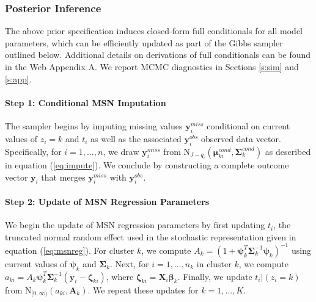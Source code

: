 \documentclass[useAMS,referee]{biom}
\begin{document}
\subsubsection{Posterior Inference} 
\label{s:postinf}
The above prior specification induces closed-form full conditionals for all model parameters, which can be efficiently updated as part of the Gibbs sampler outlined below. Additional details on derivations of full conditionals can be found in the Web Appendix A. We report MCMC diagnostics in Sections \ref{s:sim} and \ref{s:app}. 

\paragraph{\textbf{Step 1}: Conditional MSN Imputation} The sampler begins by imputing missing values $\mathbf{y}_i^{miss}$ conditional on current values of $z_i = k$ and $t_i$ as well as the associated $\mathbf{y}_i^{obs}$ observed data vector. Specifically, for $i = 1,...,n$, we draw $\mathbf{y}_i^{miss}$ from $\text{N}_{J-q_i}(\boldsymbol\mu^{cond}_{ki},\boldsymbol\Sigma^{cond}_k)$ as described in equation (\ref{eq:impute}). We conclude by constructing a complete outcome vector $\mathbf{y}_i$ that merges $\mathbf{y}_i^{miss}$ with $\mathbf{y}_i^{obs}$.

\paragraph{\textbf{Step 2:} Update of MSN Regression Parameters} We begin the update of MSN regression parameters by first updating $t_i$, the truncated normal random effect used in the stochastic representation given in equation (\ref{eq:msnreg}). For cluster $k$, we compute $A_k = (1 + \boldsymbol\psi_k^T \boldsymbol\Sigma^{-1}_k\boldsymbol
\psi_k)^{-1}$ using current values of $\boldsymbol\psi_k$ and $\boldsymbol\Sigma_k$. Next, for $i = 1,...,n_k$ in cluster $k$, we compute $a_{ki} = A_k \boldsymbol\psi_k^T \boldsymbol\Sigma^{-1}_k(\mathbf{y}_i - \boldsymbol\zeta_{ki})$, where $\boldsymbol\zeta_{ki} = \mathbf{X}_i \boldsymbol\beta_k$. Finally, we update $t_i|(z_i = k)$ from $\text{N}_{[0,\infty)}(a_{ki}, \mathbf{A}_k)$. We repeat these updates for $k = 1,...,K$. 
\end{document}
